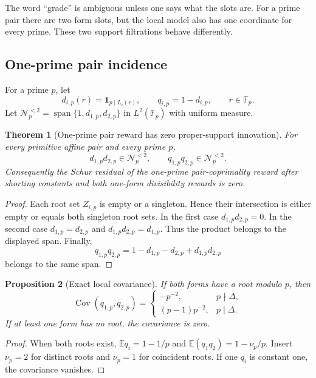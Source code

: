 \documentclass[11pt]{article}
\newtheorem{theorem}{Theorem}[section]
\newtheorem{proposition}[theorem]{Proposition}
\theoremstyle{definition}
\theoremstyle{remark}
\newcommand{\F}{\mathbb F}
\newcommand{\one}{\mathbf 1}
\newcommand{\Span}{\operatorname{span}}
\begin{document}
The word ``grade'' is ambiguous unless one says what the slots are.  For a
prime pair there are two form slots, but the local model also has one coordinate
for every prime.  These two support filtrations behave differently.

\subsection{One-prime pair incidence}

For a prime $p$, let
\[
 d_{i,p}(r)=\one_{p\mid L_i(r)},
 \qquad
 q_{i,p}=1-d_{i,p},
 \qquad r\in\F_p.
 \tag{5.1}
\]
Let $\mathcal N_{p}^{<2}=\Span\{1,d_{1,p},d_{2,p}\}$ in
$L^2(\F_p)$ with uniform measure.

\begin{theorem}[One-prime pair reward has zero proper-support innovation]
\label{thm:one-prime-zero-innovation}
For every primitive affine pair and every prime $p$,
\[
 \boxed{d_{1,p}d_{2,p}\in\mathcal N_p^{<2},
 \qquad q_{1,p}q_{2,p}\in\mathcal N_p^{<2}.}
 \tag{5.2}
\]
Consequently the Schur residual of the one-prime pair-coprimality reward after
shorting constants and both one-form divisibility rewards is zero.
\end{theorem}

\begin{proof}
Each root set $Z_{i,p}$ is empty or a singleton.  Hence their intersection is
either empty or equals both singleton root sets.  In the first case
$d_{1,p}d_{2,p}=0$.  In the second case $d_{1,p}=d_{2,p}$ and
$d_{1,p}d_{2,p}=d_{1,p}$.  Thus the product belongs to the displayed span.
Finally,
\[
 q_{1,p}q_{2,p}=1-d_{1,p}-d_{2,p}+d_{1,p}d_{2,p}
\]
belongs to the same span.
\end{proof}

\begin{proposition}[Exact local covariance]
\label{prop:local-covariance}
If both forms have a root modulo $p$, then
\[
 \operatorname{Cov}(q_{1,p},q_{2,p})
 =\begin{cases}
  -p^{-2},&p\nmid\Delta,\\[0.3em]
  (p-1)p^{-2},&p\mid\Delta.
 \end{cases}
 \tag{5.3}
\]
If at least one form has no root, the covariance is zero.
\end{proposition}

\begin{proof}
When both roots exist,
$\mathbb E q_i=1-1/p$ and
$\mathbb E(q_1q_2)=1-\nu_p/p$.  Insert $\nu_p=2$ for distinct roots and
$\nu_p=1$ for coincident roots.  If one $q_i$ is constant one, the covariance
vanishes.
\end{proof}
\end{document}
